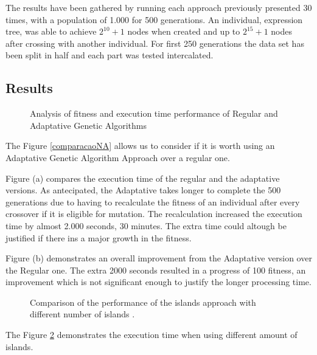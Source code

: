 \documentclass[runningheads]{llncs}
\begin{document}
The results have been gathered by running each approach previously presented 30 times, with a population of 1.000 for 500 generations. An individual, expression tree, was able to achieve \(2^{10} + 1\) nodes when created and up to \(2^{15} + 1\) nodes after crossing with another individual. For first 250 generations the data set has been split in half and each part was tested intercalated.

\subsection{Results}
\begin{figure}[H]
\centering
{}%
\qquad
{}%
\caption{Analysis of fitness and execution time performance of Regular and Adaptative Genetic Algorithms} \label{comparacaoNA}
\label{comparacaoImpl}%
\end{figure}
The Figure \ref{comparacaoNA} allows us to consider if it is worth using an Adaptative Genetic Algorithm Approach over a regular one.

Figure (a) compares the execution time of the regular and the adaptative versions. As antecipated, the Adaptative takes longer to complete the 500 generations due to having to recalculate the fitness of an individual after every crossover if it is eligible for mutation. The recalculation increased the execution time by almost 2.000 seconds, 30 minutes. The extra time could altough be justified if there ins a major growth in the fitness.

Figure (b) demonstrates an overall improvement from the Adaptative version over the Regular one. The extra 2000 seconds resulted in a progress of 100 fitness, an improvement which is not significant enough to justify the longer processing time.

\begin{figure}[H]
\centering
{}
\caption{Comparison of the performance of the islands approach with different number of islands .} \label{comparacaoilhas}
\end{figure}

The Figure \ref{comparacaoilhas} demonstrates the execution time when using different amount of islands.
\end{document}
